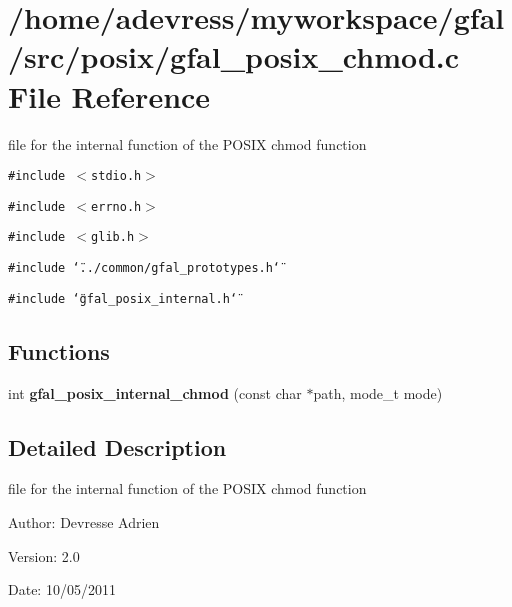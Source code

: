 \section{/home/adevress/myworkspace/gfal/src/posix/gfal\_\-posix\_\-chmod.c File Reference}
\label{gfal__posix__chmod_8c}
file for the internal function of the POSIX chmod function 

{\tt \#include $<$stdio.h$>$}\par
{\tt \#include $<$errno.h$>$}\par
{\tt \#include $<$glib.h$>$}\par
{\tt \#include \char`\"{}../common/gfal\_\-prototypes.h\char`\"{}}\par
{\tt \#include \char`\"{}gfal\_\-posix\_\-internal.h\char`\"{}}\par
\subsection*{Functions}
\begin{CompactItemize}
\item 
int \textbf{gfal\_\-posix\_\-internal\_\-chmod} (const char $\ast$path, mode\_\-t mode)\label{gfal__posix__chmod_8c_e0273008201a878710ad033d08258810}

\end{CompactItemize}


\subsection{Detailed Description}
file for the internal function of the POSIX chmod function 

\begin{Desc}
\item[Author:]Devresse Adrien \end{Desc}
\begin{Desc}
\item[Version:]2.0 \end{Desc}
\begin{Desc}
\item[Date:]10/05/2011 \end{Desc}
